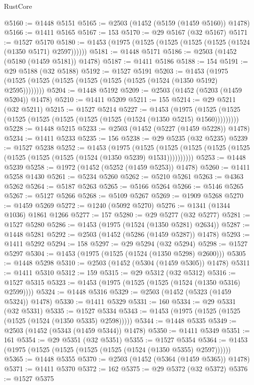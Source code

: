 \begin{lexlean}{RustCore}
\begin{coremodule}
@5160 := @1448 @5151
@5165 := @2503 (@1452 (@5159 (@1459 @5160)) @1478)
@5166 := @1411 @5165
@5167 := 153
@5170 := @29 @5167 (@32 @5167)
@5171 := @1527 @5170
@5180 := @1453 (@1975 (@1525 (@1525 (@1525 (@1525 (@1524 (@1350 @5171) @2597))))))
@5181 := @1448 @5171
@5186 := @2503 (@1452 (@5180 (@1459 @5181)) @1478)
@5187 := @1411 @5186
@5188 := 154
@5191 := @29 @5188 (@32 @5188)
@5192 := @1527 @5191
@5203 := @1453 (@1975 (@1525 (@1525 (@1525 (@1525 (@1525 (@1525 (@1524 (@1350 @5192) @2595))))))))
@5204 := @1448 @5192
@5209 := @2503 (@1452 (@5203 (@1459 @5204)) @1478)
@5210 := @1411 @5209
@5211 := 155
@5214 := @29 @5211 (@32 @5211)
@5215 := @1527 @5214
@5227 := @1453
    (@1975 (@1525 (@1525 (@1525 (@1525 (@1525 (@1525 (@1525 (@1524 (@1350 @5215) @1560)))))))))
@5228 := @1448 @5215
@5233 := @2503 (@1452 (@5227 (@1459 @5228)) @1478)
@5234 := @1411 @5233
@5235 := 156
@5238 := @29 @5235 (@32 @5235)
@5239 := @1527 @5238
@5252 := @1453
    (@1975
      (@1525 (@1525 (@1525 (@1525 (@1525 (@1525 (@1525 (@1525 (@1524 (@1350 @5239) @1531))))))))))
@5253 := @1448 @5239
@5258 := @1972 (@1452 (@5252 (@1459 @5253)) @1478)
@5260 := @1411 @5258 @1430
@5261 := @5234 @5260
@5262 := @5210 @5261
@5263 := @4363 @5262
@5264 := @5187 @5263
@5265 := @5166 @5264
@5266 := @5146 @5265
@5267 := @5127 @5266
@5268 := @5109 @5267
@5269 := @1909 @5268
@5270 := @1459 @5269
@5272 := @1240 (@5092 @5270)
@5276 := @1341 (@1344 @1036) @1861 @1266
@5277 := 157
@5280 := @29 @5277 (@32 @5277)
@5281 := @1527 @5280
@5286 := @1453 (@1975 (@1524 (@1350 @5281) @2634))
@5287 := @1448 @5281
@5292 := @2503 (@1452 (@5286 (@1459 @5287)) @1478)
@5293 := @1411 @5292
@5294 := 158
@5297 := @29 @5294 (@32 @5294)
@5298 := @1527 @5297
@5304 := @1453 (@1975 (@1525 (@1524 (@1350 @5298) @2600)))
@5305 := @1448 @5298
@5310 := @2503 (@1452 (@5304 (@1459 @5305)) @1478)
@5311 := @1411 @5310
@5312 := 159
@5315 := @29 @5312 (@32 @5312)
@5316 := @1527 @5315
@5323 := @1453 (@1975 (@1525 (@1525 (@1524 (@1350 @5316) @2599))))
@5324 := @1448 @5316
@5329 := @2503 (@1452 (@5323 (@1459 @5324)) @1478)
@5330 := @1411 @5329
@5331 := 160
@5334 := @29 @5331 (@32 @5331)
@5335 := @1527 @5334
@5343 := @1453 (@1975 (@1525 (@1525 (@1525 (@1524 (@1350 @5335) @2598)))))
@5344 := @1448 @5335
@5349 := @2503 (@1452 (@5343 (@1459 @5344)) @1478)
@5350 := @1411 @5349
@5351 := 161
@5354 := @29 @5351 (@32 @5351)
@5355 := @1527 @5354
@5364 := @1453 (@1975 (@1525 (@1525 (@1525 (@1525 (@1524 (@1350 @5355) @2597))))))
@5365 := @1448 @5355
@5370 := @2503 (@1452 (@5364 (@1459 @5365)) @1478)
@5371 := @1411 @5370
@5372 := 162
@5375 := @29 @5372 (@32 @5372)
@5376 := @1527 @5375

\end{coremodule}
\end{lexlean}
